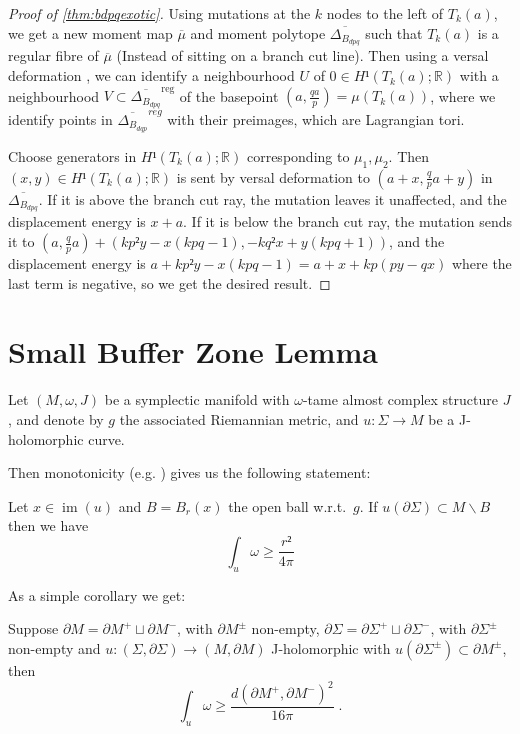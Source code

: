 \documentclass[12pt,a4paper,draft]{scrartcl}
\DeclareMathOperator{\im}{im}
\begin{document}
\begin{proof}[Proof of \cref{thm:bdpqexotic}]
  Using mutations at the $k$ nodes to the left of $T_k(a)$, we get a new moment map $\overline{μ}$ and moment polytope $\overline{Δ_{B_{dpq}}}$ such that $T_k(a)$ is a regular  fibre of $\overline{μ}$ (Instead of sitting on a branch cut line).
  Then using a versal deformation , we can identify a neighbourhood $U$ of $0 ∈ H¹(T_k(a);ℝ)$ with a neighbourhood $V ⊂ \overline{Δ_{B_{dpq}}}^{\text{reg}}$ of the basepoint $(a,\frac{qa}{p}) = μ(T_k(a))$, where we identify points in $\overline{Δ_{B_{dqp}}}^{reg}$ with their preimages, which are Lagrangian tori.

  Choose generators in $H¹(T_k(a);ℝ)$ corresponding to $μ_1,μ_2$. Then $(x,y) ∈ H¹(T_k(a);ℝ)$ is sent by versal deformation to $(a + x, \frac{q}{p}a + y)$ in $\overline{Δ_{B_{dpq}}}$.
  If it is above the branch cut ray, the mutation leaves it unaffected, and the displacement energy is $x+a$.
  If it is below the branch cut ray, the mutation sends it to $(a,\frac{q}{p}a) + (kp²y -x(kpq -1), -kq²x + y(kpq +1))$, and the displacement energy is $a +kp²y - x(kpq-1) = a + x + kp(py-qx)$ where the last term is negative, so we get the desired result.
\end{proof}


\section{Small Buffer Zone Lemma}

Let $(M,ω,J)$ be a symplectic manifold with $ω$-tame almost complex structure $J$, and denote by $g$ the associated Riemannian metric, and $u\colon Σ → M$ be a J-holomorphic curve.

Then monotonicity (e.g. \cite[Proposition 4.3.1 (ii)]{sikorav1994}) gives us the following statement:

\begin{lemma}[Monotonicity]
  \label{lem:monotonicity}
  Let $x ∈ \im(u)$ and $B = B_r(x)$ the open ball w.r.t.\ $g$. If $u(∂Σ) ⊂ M ∖ B$ then we have
  \[∫_u ω ≥ \frac{r²}{4π}\]
\end{lemma}

As a simple corollary we get:

\begin{corollary}
  \label{cor:small_buffer}
  Suppose $∂M = ∂M^+ ⊔ ∂M^-$, with $∂M^±$ non-empty, $∂Σ = ∂Σ^+ ⊔ ∂Σ^-$, with $∂Σ^±$ non-empty and $u\colon (Σ,∂Σ) → (M,∂M)$ J-holomorphic with $u(∂Σ^±) ⊂ ∂M^±$, then
  \[∫_u ω ≥ \frac{d(∂M^+,∂M^-)^2}{16π} \; .\]
\end{corollary}
\end{document}
